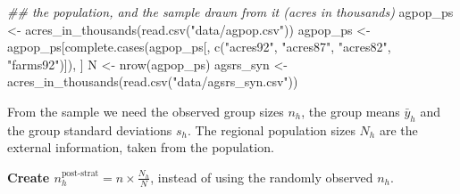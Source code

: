 \documentclass[
  letterpaper,
  DIV=11,
  numbers=noendperiod]{scrreprt}
\newenvironment{Shaded}{\begin{snugshade}}{\end{snugshade}}
\newcommand{\CommentTok}[1]{\textcolor[rgb]{0.37,0.37,0.37}{#1}}
\newcommand{\DocumentationTok}[1]{\textcolor[rgb]{0.37,0.37,0.37}{\textit{#1}}}
\newcommand{\FunctionTok}[1]{\textcolor[rgb]{0.28,0.35,0.67}{#1}}
\newcommand{\NormalTok}[1]{\textcolor[rgb]{0.00,0.23,0.31}{#1}}
\newcommand{\OtherTok}[1]{\textcolor[rgb]{0.00,0.23,0.31}{#1}}
\newcommand{\SpecialCharTok}[1]{\textcolor[rgb]{0.37,0.37,0.37}{#1}}
\newcommand{\StringTok}[1]{\textcolor[rgb]{0.13,0.47,0.30}{#1}}
\renewcommand{\[}{\begin{equation}}
\renewcommand{\]}{\end{equation}}
\begin{document}
\begin{Shaded}
\begin{Highlighting}[]
\DocumentationTok{\#\# the population, and the sample drawn from it (acres in thousands)}
\NormalTok{agpop\_ps }\OtherTok{\textless{}{-}} \FunctionTok{acres\_in\_thousands}\NormalTok{(}\FunctionTok{read.csv}\NormalTok{(}\StringTok{"data/agpop.csv"}\NormalTok{))}
\NormalTok{agpop\_ps }\OtherTok{\textless{}{-}}\NormalTok{ agpop\_ps[}\FunctionTok{complete.cases}\NormalTok{(agpop\_ps[, }\FunctionTok{c}\NormalTok{(}\StringTok{"acres92"}\NormalTok{, }\StringTok{"acres87"}\NormalTok{, }\StringTok{"acres82"}\NormalTok{, }\StringTok{"farms92"}\NormalTok{)]), ]}
\NormalTok{N }\OtherTok{\textless{}{-}} \FunctionTok{nrow}\NormalTok{(agpop\_ps)}
\NormalTok{agsrs\_syn }\OtherTok{\textless{}{-}} \FunctionTok{acres\_in\_thousands}\NormalTok{(}\FunctionTok{read.csv}\NormalTok{(}\StringTok{"data/agsrs\_syn.csv"}\NormalTok{))}
\end{Highlighting}
\end{Shaded}

From the sample we need the observed group sizes \(n_h\), the group
means \(\bar y_h\) and the group standard deviations \(s_h\). The
regional population sizes \(N_h\) are the external information, taken
from the population.

\begin{Shaded}
\end{Shaded}

\textbf{Create \(n_h^{\text{post-strat}} = n \times \frac{N_h}{N}\)},
instead of using the randomly observed \(n_h\).
\end{document}
